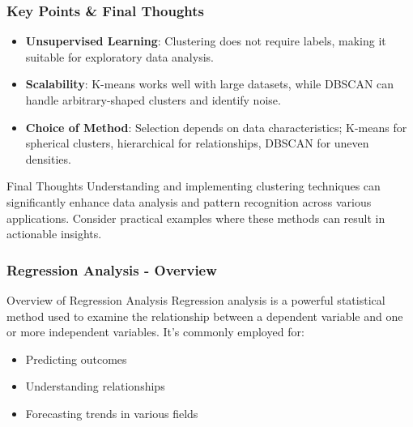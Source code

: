 \documentclass[aspectratio=169]{beamer}
\begin{document}
\begin{frame}[fragile]
    \frametitle{Key Points & Final Thoughts}
    \begin{itemize}
        \item \textbf{Unsupervised Learning}: Clustering does not require labels, making it suitable for exploratory data analysis.
        \item \textbf{Scalability}: K-means works well with large datasets, while DBSCAN can handle arbitrary-shaped clusters and identify noise.
        \item \textbf{Choice of Method}: Selection depends on data characteristics; K-means for spherical clusters, hierarchical for relationships, DBSCAN for uneven densities.
    \end{itemize}

    \begin{block}{Final Thoughts}
        Understanding and implementing clustering techniques can significantly enhance data analysis and pattern recognition across various applications. Consider practical examples where these methods can result in actionable insights.
    \end{block}
\end{frame}

\begin{frame}[fragile]
    \frametitle{Regression Analysis - Overview}
    \begin{block}{Overview of Regression Analysis}
        Regression analysis is a powerful statistical method used to examine the relationship between a dependent variable and one or more independent variables. It’s commonly employed for:
        \begin{itemize}
            \item Predicting outcomes
            \item Understanding relationships
            \item Forecasting trends in various fields
        \end{itemize}
    \end{block}
\end{frame}
\end{document}
